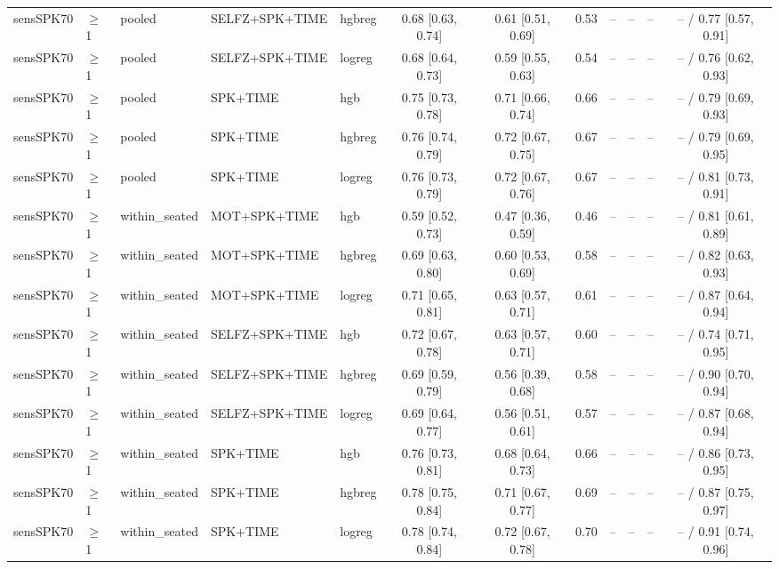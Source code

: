 \begin{longtable}{@{}lllllcccrrrc@{}}
sensSPK70 & $\geq$1 & pooled & SELFZ+SPK+TIME & hgbreg & 0.68 [0.63, 0.74] & 0.61 [0.51, 0.69] & 0.53 & -- & -- & -- & -- / 0.77 [0.57, 0.91] \\
sensSPK70 & $\geq$1 & pooled & SELFZ+SPK+TIME & logreg & 0.68 [0.64, 0.73] & 0.59 [0.55, 0.63] & 0.54 & -- & -- & -- & -- / 0.76 [0.62, 0.93] \\
sensSPK70 & $\geq$1 & pooled & SPK+TIME & hgb & 0.75 [0.73, 0.78] & 0.71 [0.66, 0.74] & 0.66 & -- & -- & -- & -- / 0.79 [0.69, 0.93] \\
sensSPK70 & $\geq$1 & pooled & SPK+TIME & hgbreg & 0.76 [0.74, 0.79] & 0.72 [0.67, 0.75] & 0.67 & -- & -- & -- & -- / 0.79 [0.69, 0.95] \\
sensSPK70 & $\geq$1 & pooled & SPK+TIME & logreg & 0.76 [0.73, 0.79] & 0.72 [0.67, 0.76] & 0.67 & -- & -- & -- & -- / 0.81 [0.73, 0.91] \\
sensSPK70 & $\geq$1 & within\_seated & MOT+SPK+TIME & hgb & 0.59 [0.52, 0.73] & 0.47 [0.36, 0.59] & 0.46 & -- & -- & -- & -- / 0.81 [0.61, 0.89] \\
sensSPK70 & $\geq$1 & within\_seated & MOT+SPK+TIME & hgbreg & 0.69 [0.63, 0.80] & 0.60 [0.53, 0.69] & 0.58 & -- & -- & -- & -- / 0.82 [0.63, 0.93] \\
sensSPK70 & $\geq$1 & within\_seated & MOT+SPK+TIME & logreg & 0.71 [0.65, 0.81] & 0.63 [0.57, 0.71] & 0.61 & -- & -- & -- & -- / 0.87 [0.64, 0.94] \\
sensSPK70 & $\geq$1 & within\_seated & SELFZ+SPK+TIME & hgb & 0.72 [0.67, 0.78] & 0.63 [0.57, 0.71] & 0.60 & -- & -- & -- & -- / 0.74 [0.71, 0.95] \\
sensSPK70 & $\geq$1 & within\_seated & SELFZ+SPK+TIME & hgbreg & 0.69 [0.59, 0.79] & 0.56 [0.39, 0.68] & 0.58 & -- & -- & -- & -- / 0.90 [0.70, 0.94] \\
sensSPK70 & $\geq$1 & within\_seated & SELFZ+SPK+TIME & logreg & 0.69 [0.64, 0.77] & 0.56 [0.51, 0.61] & 0.57 & -- & -- & -- & -- / 0.87 [0.68, 0.94] \\
sensSPK70 & $\geq$1 & within\_seated & SPK+TIME & hgb & 0.76 [0.73, 0.81] & 0.68 [0.64, 0.73] & 0.66 & -- & -- & -- & -- / 0.86 [0.73, 0.95] \\
sensSPK70 & $\geq$1 & within\_seated & SPK+TIME & hgbreg & 0.78 [0.75, 0.84] & 0.71 [0.67, 0.77] & 0.69 & -- & -- & -- & -- / 0.87 [0.75, 0.97] \\
sensSPK70 & $\geq$1 & within\_seated & SPK+TIME & logreg & 0.78 [0.74, 0.84] & 0.72 [0.67, 0.78] & 0.70 & -- & -- & -- & -- / 0.91 [0.74, 0.96] \\

\end{longtable}
